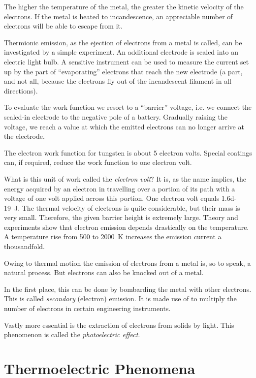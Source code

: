 The higher the temperature of the metal, the greater the kinetic velocity of the electrons. If the metal is heated to incandescence, an appreciable number of electrons will be able to escape from it.

Thermionic emission, as the ejection of electrons from a metal is called, can be investigated by a simple experiment. An additional electrode is sealed into an electric light bulb. A sensitive instrument can be used to measure the current set up by the part of ``evaporating'' electrons that reach the new electrode (a part, and not all, because the electrons fly out of the incandescent filament in all directions).

To evaluate the work function we resort to a ``barrier'' voltage, i.e. we connect the sealed-in electrode to the negative pole of a battery. Gradually raising the voltage, we reach a value at which the emitted electrons can no longer arrive at the electrode.

The electron work function for tungsten is about 5 electron volts. Special coatings can, if required, reduce the work function to one electron volt.

What is this unit of work called the \emph{electron volt}? It is, as the name implies, the energy acquired by an electron in travelling over a portion of its path with a voltage of one volt applied across this portion. One electron volt equals \SI{1.6d-19}{\joule}. The thermal velocity of electrons is quite considerable, but their mass is very small. Therefore, the given barrier height is extremely large. Theory and experiments show that electron emission depends drastically on the temperature. A temperature rise from 500 to \SI{2000}{\kelvin} increases the emission current a thousandfold.

Owing to thermal motion the emission of electrons from a metal is, so to speak, a natural process. But electrons can also be knocked out of a metal.

In the first place, this can be done by bombarding the metal with other electrons. This is called \emph{secondary} (electron) emission. It is made use of to multiply the number of electrons in certain engineering instruments.

Vastly more essential is the extraction of electrons from solids by light. This phenomenon is called the \emph{photoelectric effect}.

\section{Thermoelectric Phenomena}

